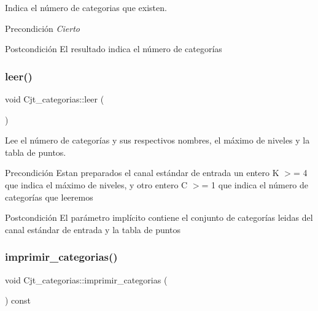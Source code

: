 Indica el número de categorias que existen. 

\begin{DoxyPrecond}{Precondición}
{\itshape Cierto} 
\end{DoxyPrecond}
\begin{DoxyPostcond}{Postcondición}
El resultado indica el número de categorías 
\end{DoxyPostcond}
\mbox{\label{class_cjt__categorias_a25f0264b46b1c1de5af074bfae1ee5ed}} 
\subsubsection{\texorpdfstring{leer()}{leer()}}
{\footnotesize\ttfamily void Cjt\+\_\+categorias\+::leer (\begin{DoxyParamCaption}{ }\end{DoxyParamCaption})}



Lee el número de categorías y sus respectivos nombres, el máximo de niveles y la tabla de puntos. 

\begin{DoxyPrecond}{Precondición}
Estan preparados el canal estándar de entrada un entero K $>$= 4 que indica el máximo de niveles, y otro entero C $>$= 1 que indica el número de categorías que leeremos 
\end{DoxyPrecond}
\begin{DoxyPostcond}{Postcondición}
El parámetro implícito contiene el conjunto de categorías leidas del canal estándar de entrada y la tabla de puntos 
\end{DoxyPostcond}
\mbox{\label{class_cjt__categorias_acd18a2fe2b4336dd5faa7e418962d713}} 
\subsubsection{\texorpdfstring{imprimir\+\_\+categorias()}{imprimir\_categorias()}}
{\footnotesize\ttfamily void Cjt\+\_\+categorias\+::imprimir\+\_\+categorias (\begin{DoxyParamCaption}{ }\end{DoxyParamCaption}) const}



